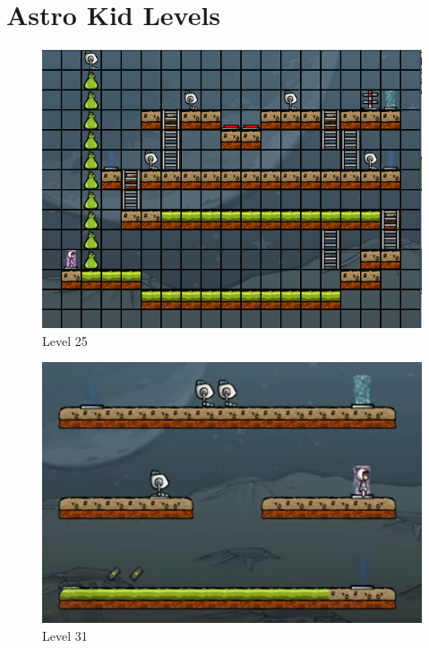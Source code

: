 \section{Astro Kid Levels}
\begin{figure}
	\centering
	
	\caption{Level 25}
	\label{level25}
	
	\includegraphics[width=1.0\textwidth]{appendix/img/lvl25}
\end{figure}
\begin{figure}
	\centering
	\caption{Level 31}
	\label{level31}
		
	\includegraphics[width=1.0\textwidth]{appendix/img/lvl31}
\end{figure}

